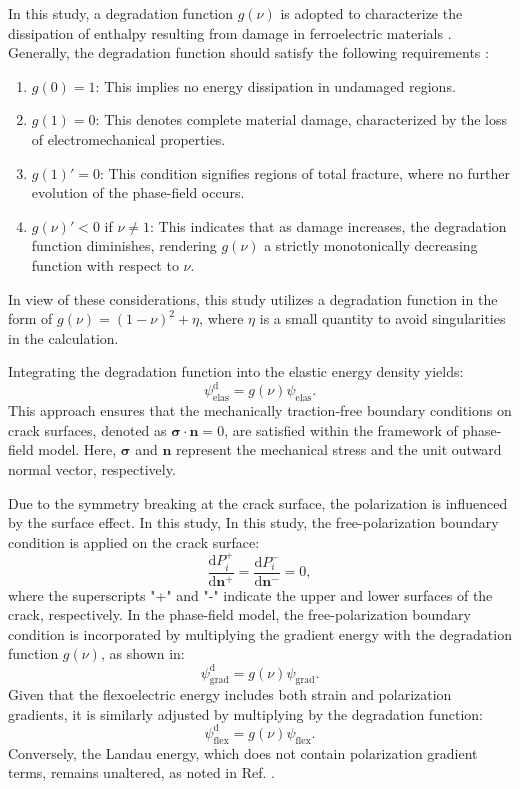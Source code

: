In this study, a degradation function $g(\nu)$ is adopted to characterize the dissipation of enthalpy resulting from damage in ferroelectric materials \cite{abdollahi_phase-field_2011,xu_fracture_2010}. Generally, the degradation function should satisfy the following requirements \cite{miehe_thermodynamically_2010}:
\begin{enumerate}
    \item $g(0) = 1 $: This implies no energy dissipation in undamaged regions.
    \item $g(1) = 0 $: This denotes complete material damage, characterized by the loss of electromechanical properties.
    \item $g(1)' = 0$: This condition signifies regions of total fracture, where no further evolution of the phase-field occurs.
    \item $g(\nu)'<0$ if $\nu\neq 1$: This indicates that as damage increases, the degradation function diminishes, rendering $g(\nu)$ a strictly monotonically decreasing function with respect to $\nu$.
\end{enumerate}
In view of these considerations, this study utilizes a degradation function in the form of $g(\nu)=(1-\nu)^2+\eta$, where $\eta$ is a small quantity to avoid singularities in the calculation. 

Integrating the degradation function into the elastic energy density yields:
\begin{equation}
    \psi_{\mathrm{elas}}^\mathrm{d}=g(\nu)\psi_{\mathrm{elas}}.
\end{equation}
This approach ensures that the mechanically traction-free boundary conditions on crack surfaces, denoted as $\mathbf{\sigma}\cdot\mathbf{n}=0$, are satisfied within the framework of phase-field model. Here, $\mathbf{\sigma}$ and $\mathbf{n}$ represent the mechanical stress and the unit outward normal vector, respectively.

Due to the symmetry breaking at the crack surface, the polarization is influenced by the surface effect. In this study, In this study, the free-polarization boundary condition is applied on the crack surface:
\begin{equation}
    \frac{\mathrm{d}P_i^+}{\mathrm{d}\mathbf{n}^+}=\frac{\mathrm{d}P_i^-}{\mathrm{d}\mathrm{\mathbf{n}^-}}=0,
\end{equation}
where the superscripts "+" and "-" indicate the upper and lower surfaces of the crack, respectively. In the phase-field model, the free-polarization boundary condition is incorporated by multiplying the gradient energy with the degradation function $g(\nu)$, as shown in:
\begin{equation}
    \psi_\mathrm{grad}^\mathrm{d}=g(\nu)\psi_\mathrm{grad}.
\end{equation}
Given that the flexoelectric energy includes both strain and polarization gradients, it is similarly adjusted by multiplying by the degradation function:
\begin{equation}
    \psi_{\mathrm{flex}}^\mathrm{d}=g(\nu) \psi_{\mathrm{flex}}.
\end{equation}
Conversely, the Landau energy, which does not contain polarization gradient terms, remains unaltered, as noted in Ref. \cite{abdollahi_phase-field_2011}.

